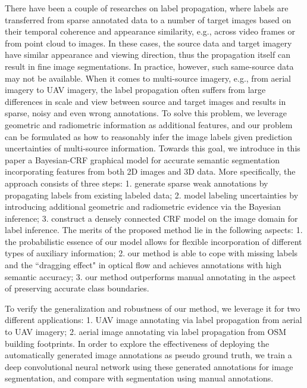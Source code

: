 There have been a couple of researches on label propagation, where labels are transferred  from sparse annotated data to a number of target images based on their temporal coherence and appearance similarity, e.g., across video frames or from point cloud to images. In these cases, the source data and target imagery have similar appearance and viewing direction, thus the propagation itself can result in fine image segmentations. In practice, however, such same-source data may not be available. When it comes to multi-source imagery, e.g., from aerial imagery to UAV imagery, the label propagation often suffers from large differences in  scale and view between source and target images and results in sparse, noisy and even wrong annotations. To solve this problem, we leverage geometric and radiometric information as additional features, and our problem can be formulated as how to reasonably infer the image labels given prediction uncertainties of multi-source information. Towards this goal, we introduce in this paper a Bayesian-CRF graphical model for accurate semantic segmentation incorporating features from both 2D images and 3D data. More specifically, the approach consists of three steps: 1. generate sparse weak annotations by propagating labels from existing labeled data; 2. model labeling uncertainties by introducing additional geometric and radiometric evidence via the Bayesian inference; 3. construct a densely connected CRF model on the image domain for label inference. The merits of the proposed method lie in the following aspects: 1. the probabilistic essence of our model allows for flexible incorporation of different types of auxiliary information; 2. our method is able to cope with missing labels and the ``dragging effect" in optical flow and achieves annotations with high semantic accuracy; 3. our method outperforms manual annotating in the aspect of preserving accurate class boundaries.  %

To verify the generalization and robustness of our method, we leverage it for two different applications: 1. UAV image annotating via label propagation from aerial to UAV imagery; 2. aerial image annotating via label propagation from OSM building footprints. In order to explore the effectiveness of deploying the automatically generated image annotations as pseudo ground truth, we train a deep convolutional neural network using these generated annotations for image segmentation, and compare with segmentation using manual annotations. 

